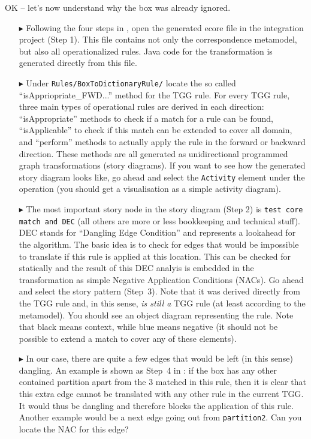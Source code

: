 OK -- let's now understand why the box was already ignored.

\begin{itemize}
\item[$\blacktriangleright$] Following the four steps in , open the generated ecore file in the integration project (Step 1).
This file contains not only the correspondence metamodel, but also all operationalized rules.
Java code for the transformation is generated directly from this file.
\item[$\blacktriangleright$] Under \texttt{Rules/BoxToDictionaryRule/} locate the so called ``isAppriopriate\_FWD...'' method for the TGG rule.
For every TGG rule, three main types of operational rules are derived in each direction:  ``isAppropriate'' methods to check if a match for a rule can be found, ``isApplicable'' to check if this match can be extended to cover all domain, and ``perform'' methods to actually apply the rule in the forward or backward direction.
These methods are all generated as unidirectional programmed graph transformations (story diagrams).
If you want to see how the generated story diagram looks like, go ahead and select the \texttt{Activity} element under the operation (you should get a visualisation as a simple activity diagram).
\item[$\blacktriangleright$] The most important story node in the story diagram (Step 2) is \texttt{test core match and DEC} (all others are more or less bookkeeping and technical stuff).
DEC stands for ``Dangling Edge Condition'' and represents a lookahead for the algorithm.
The basic idea is to check for edges that would be impossible to translate if this rule is applied at this location.
This can be checked for statically and the result of this DEC analyis is embedded in the transformation as simple Negative Application Conditions (NACs). 
Go ahead and select the story pattern (Step~3).
Note that it was derived directly from the TGG rule and, in this sense, \emph{is still a} TGG rule (at least according to the metamodel).
You should see an object diagram representing the rule.
Note that black means context, while blue means negative (it should not be possible to extend a match to cover any of these elements).

\item[$\blacktriangleright$] In our case, there are quite a few edges that would be left (in this sense) dangling.
An example is shown as Step~4 in :  if the box has any other contained partition apart from the 3 matched in this rule, then it is clear that this extra edge cannot be translated with any other rule in the current TGG.
It would thus be dangling and therefore blocks the application of this rule.
Another example would be a next edge going out from \texttt{partition2}.
Can you locate the NAC for this edge?
\end{itemize}

